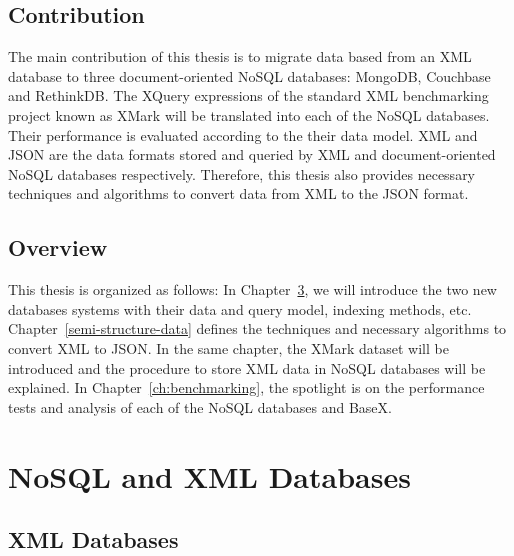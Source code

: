 \documentclass[a4paper,12pt]{book}
\begin{document}
	\section{Contribution}
		The main contribution of this thesis is to migrate data based from an XML database to three document-oriented NoSQL databases: MongoDB, Couchbase and RethinkDB. The XQuery expressions of the standard XML benchmarking project known as XMark will be  translated  into each of the NoSQL databases. Their performance is evaluated according to the their data model. XML and JSON are the data formats stored and queried by XML and document-oriented NoSQL databases respectively. Therefore, this thesis also provides necessary techniques and algorithms to convert data from XML to the JSON format.
		
	\section{Overview }
		This thesis is organized as follows: In Chapter~\ref{nosql-xml-database}, we will introduce the two new databases systems with their data and query model, indexing methods, etc. Chapter~\ref{semi-structure-data} defines the techniques and necessary algorithms to convert XML to JSON. In the same chapter, the XMark dataset will be introduced and the procedure to store XML data in NoSQL databases will be explained. In Chapter~\ref{ch:benchmarking}, the spotlight is on the performance tests and analysis of each of the NoSQL databases and BaseX.
		
		
		
	\chapter{NoSQL and XML Databases}\label{nosql-xml-database}
		\section{XML Databases}
\end{document}
